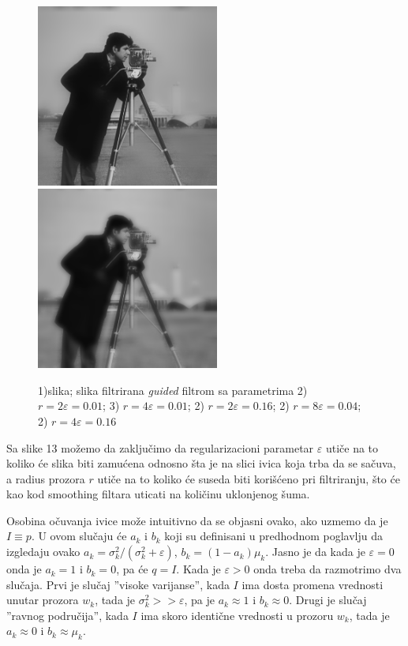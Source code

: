 \documentclass[a4paper,12pt,titlepage]{article}
\begin{document}
\begin{figure}[ht!]
\includegraphics[width=60mm]{img/imgGF8_04.png}
\includegraphics[width=60mm]{img/imgGF4_16.png}
\caption{1)slika; slika filtrirana \emph{guided} filtrom sa parametrima 2) $r = 2 \varepsilon = 0.01$; 3) $r = 4 \varepsilon = 0.01$; 2) $r = 2 \varepsilon = 0.16$; 2) $r = 8 \varepsilon = 0.04$; 2) $r = 4 \varepsilon = 0.16$}
\label{overflow}
\end{figure}

Sa slike 13 možemo da zaključimo da regularizacioni parametar $\varepsilon$ utiče na to koliko će slika biti zamućena odnosno šta je na slici ivica koja trba da se sačuva, a radius prozora $r$ utiče na to koliko će suseda biti korišćeno pri filtriranju, što će kao kod smoothing filtara uticati na količinu uklonjenog šuma. 

Osobina očuvanja ivice može intuitivno da se objasni ovako, ako uzmemo da je $I \equiv p$. U ovom slučaju će $a_k$ i $b_k$ koji su definisani u predhodnom poglavlju da izgledaju ovako $a_k = \sigma_k^2 / (\sigma_k^2 + \varepsilon)$, $b_k = (1 - a_k)\mu_k$. Jasno je da kada je $\varepsilon = 0$ onda je $a_k = 1$ i $b_k = 0$, pa će $q = I$. Kada je $\varepsilon > 0$ onda treba da razmotrimo dva slučaja. Prvi je slučaj ''visoke varijanse'', kada $I$ ima dosta promena vrednosti unutar prozora $w_k$, tada je $\sigma_k^2 >> \varepsilon$, pa je $a_k \approx 1$ i $b_k \approx 0$. Drugi je slučaj ''ravnog područija'', kada $I$ ima skoro identične vrednosti u prozoru $w_k$, tada je $a_k \approx 0$ i $b_k \approx \mu_k$. 
\end{document}
